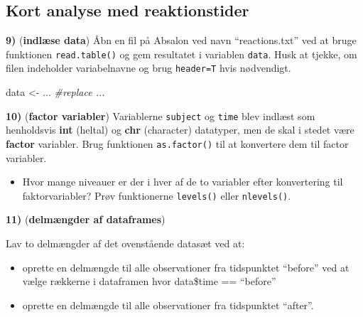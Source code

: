 \documentclass[
]{book}
\newenvironment{Shaded}{\begin{snugshade}}{\end{snugshade}}
\newcommand{\CommentTok}[1]{\textcolor[rgb]{0.37,0.37,0.37}{\textit{#1}}}
\newcommand{\DocumentationTok}[1]{\textcolor[rgb]{0.37,0.37,0.37}{\textbf{\textit{#1}}}}
\newcommand{\FunctionTok}[1]{\textcolor[rgb]{0.27,0.27,0.27}{\textbf{#1}}}
\newcommand{\NormalTok}[1]{#1}
\newcommand{\OtherTok}[1]{\textcolor[rgb]{0.37,0.37,0.37}{#1}}
\newcommand{\SpecialCharTok}[1]{\textcolor[rgb]{0.43,0.43,0.43}{\textbf{#1}}}
\providecommand{\tightlist}{%
  \setlength{\itemsep}{0pt}\setlength{\parskip}{0pt}}
\begin{document}
\subsection{Kort analyse med reaktionstider}\label{kort-analyse-med-reaktionstider}

\textbf{9)} (\textbf{indlæse data}) Åbn en fil på Absalon ved navn ``reactions.txt'' ved at bruge funktionen \texttt{read.table()} og gem resultatet i variablen \texttt{data}. Husk at tjekke, om filen indeholder variabelnavne og brug \texttt{header=T} hvis nødvendigt.

\begin{Shaded}
\begin{Highlighting}[]
\NormalTok{data }\OtherTok{\textless{}{-}}\NormalTok{ ... }\CommentTok{\#replace ...}
\end{Highlighting}
\end{Shaded}

\textbf{10)} (\textbf{factor variabler}) Variablerne \texttt{subject} og \texttt{time} blev indlæst som henholdsvis \textbf{int} (heltal) og \textbf{chr} (character) datatyper, men de skal i stedet være \textbf{factor} variabler. Brug funktionen \texttt{as.factor()} til at konvertere dem til factor variabler.

\begin{Shaded}
\end{Shaded}

\begin{itemize}
\tightlist
\item
  Hvor mange niveauer er der i hver af de to variabler efter konvertering til faktorvariabler? Prøv funktionerne \texttt{levels()} eller \texttt{nlevels()}.
\end{itemize}

\textbf{11)} (\textbf{delmængder af dataframes})

Lav to delmængder af det ovenstående datasæt ved at:

\begin{itemize}
\tightlist
\item
  oprette en delmængde til alle observationer fra tidspunktet ``before'' ved at vælge rækkerne i dataframen hvor data\$time == ``before''
\item
  oprette en delmængde til alle observationer fra tidspunktet ``after''.
\end{itemize}
\end{document}

